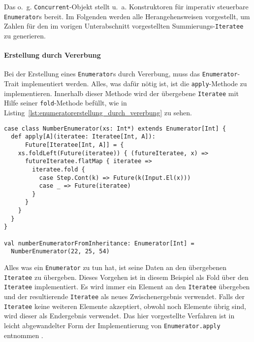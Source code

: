 Das o.~g. \lstinline|Concurrent|-Objekt stellt u.~a. Konstruktoren für imperativ steuerbare \lstinline|Enumerator|s bereit.
Im Folgenden werden alle Herangehensweisen vorgestellt, um Zahlen für den im vorigen Unterabschnitt vorgestellten Summierungs-\lstinline|Iteratee| zu generieren.

\paragraph{Erstellung durch Vererbung} %
\label{par:enumeratorerstellung_durch_vererbung}\mbox{} %

Bei der Erstellung eines \lstinline|Enumerator|s durch Vererbung, muss das \lstinline|Enumerator|-Trait implementiert werden.
Alles, was dafür nötig ist, ist die \lstinline|apply|-Methode zu implementieren.
Innerhalb dieser Methode wird der übergebene \lstinline|Iteratee| mit Hilfe seiner \lstinline|fold|-Methode befüllt, wie in Listing~\ref{lst:enumeratorerstellung_durch_vererbung} zu sehen.

\begin{lstlisting}[caption=Erstellung eines Enumerators durch Vererbung, label=lst:enumeratorerstellung_durch_vererbung]
case class NumberEnumerator(xs: Int*) extends Enumerator[Int] {
  def apply[A](iteratee: Iteratee[Int, A]):
      Future[Iteratee[Int, A]] = {
    xs.foldLeft(Future(iteratee)) { (futureIteratee, x) =>
      futureIteratee.flatMap { iteratee =>
        iteratee.fold {
          case Step.Cont(k) => Future(k(Input.El(x)))
          case _ => Future(iteratee)
        }
      }
    }
  }
}

val numberEnumeratorFromInheritance: Enumerator[Int] =
  NumberEnumerator(22, 25, 54)
\end{lstlisting}

Alles was ein \lstinline|Enumerator| zu tun hat, ist seine Daten an den übergebenen \lstinline|Iteratee| zu übergeben.
Dieses Vorgehen ist in diesem Beispiel als Fold über den \lstinline|Iteratee| implementiert.
Es wird immer ein Element an den \lstinline|Iteratee| übergeben und der resultierende \lstinline|Iteratee| als neues Zwischenergebnis verwendet.
Falls der \lstinline|Iteratee| keine weiteren Elemente akzeptiert, obwohl noch Elemente übrig sind, wird dieser als Endergebnis verwendet.
Das hier vorgestellte Verfahren ist in leicht abgewandelter Form der Implementierung von \lstinline|Enumerator.apply| entnommen \cite[vgl.][Z.~611 und Z.~654]{play_enumerator_source_code}.


